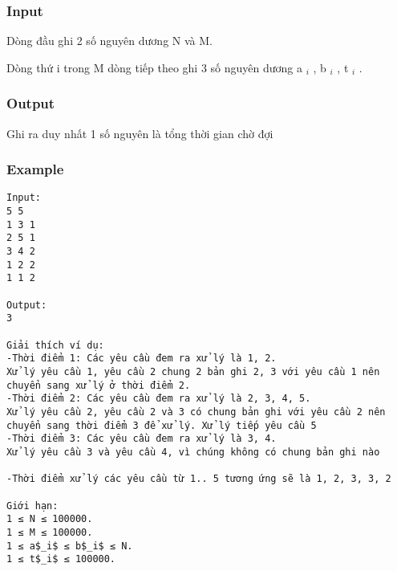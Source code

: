 \subsubsection{Input}

Dòng đầu ghi 2 số nguyên dương N và M.

Dòng thứ i trong M dòng tiếp theo ghi 3 số nguyên dương a $_ i $ , b $_ i $ , t $_ i $ .

\subsubsection{Output}

Ghi ra duy nhất 1 số nguyên là tổng thời gian chờ đợi

\subsubsection{Example}
\begin{verbatim}
Input:
5 5
1 3 1
2 5 1
3 4 2
1 2 2
1 1 2

Output:
3

Giải thích ví dụ: 
-Thời điểm 1: Các yêu cầu đem ra xử lý là 1, 2.
Xử lý yêu cầu 1, yêu cầu 2 chung 2 bản ghi 2, 3 với yêu cầu 1 nên chuyển sang xử lý ở thời điểm 2.
-Thời điểm 2: Các yêu cầu đem ra xử lý là 2, 3, 4, 5.
Xử lý yêu cầu 2, yêu cầu 2 và 3 có chung bản ghi với yêu cầu 2 nên chuyển sang thời điểm 3 để xử lý. Xử lý tiếp yêu cầu 5
-Thời điểm 3: Các yêu cầu đem ra xử lý là 3, 4.
Xử lý yêu cầu 3 và yêu cầu 4, vì chúng không có chung bản ghi nào

-Thời điểm xử lý các yêu cầu từ 1.. 5 tương ứng sẽ là 1, 2, 3, 3, 2

Giới hạn:
1 ≤ N ≤ 100000. 
1 ≤ M ≤ 100000.
1 ≤ a$_i$ ≤ b$_i$ ≤ N. 
1 ≤ t$_i$ ≤ 100000. 

\end{verbatim}